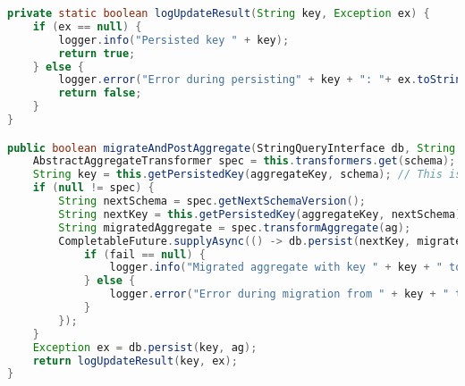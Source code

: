 \begin{lstlisting}[language=Java, caption={Metode for håndtering av POST-spørring i Migrator.}]
private static boolean logUpdateResult(String key, Exception ex) {
    if (ex == null) {
        logger.info("Persisted key " + key);
        return true;
    } else {
        logger.error("Error during persisting" + key + ": "+ ex.toString());
        return false;
    }
}

public boolean migrateAndPostAggregate(StringQueryInterface db, String aggregateKey, String schema, String ag) {
    AbstractAggregateTransformer spec = this.transformers.get(schema);
    String key = this.getPersistedKey(aggregateKey, schema); // This is the key used by the application
    if (null != spec) {
        String nextSchema = spec.getNextSchemaVersion();
        String nextKey = this.getPersistedKey(aggregateKey, nextSchema);
        String migratedAggregate = spec.transformAggregate(ag);
        CompletableFuture.supplyAsync(() -> db.persist(nextKey, migratedAggregate)).thenAcceptAsync((fail) -> {
            if (fail == null) {
                logger.info("Migrated aggregate with key " + key + " to " + nextKey);
            } else {
                logger.error("Error during migration from " + key + " to " + nextKey + ":\n"+ fail.toString());
            }
        });
    }
    Exception ex = db.persist(key, ag);
    return logUpdateResult(key, ex);
}
\end{lstlisting}
